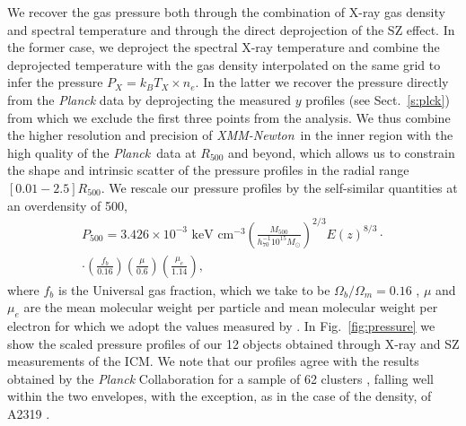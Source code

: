 \documentclass[traditabstract   ]{aa} %
\newcommand{\xmm}{{\it XMM-Newton}}
\newcommand{\planck}{{\it Planck}}
\begin{document}
We recover the gas pressure both through the combination of X-ray gas density and spectral temperature and through the direct deprojection of the SZ effect. In the former case, we deproject the spectral X-ray temperature \citep[e.g.,][see Sect. \ref{sec:spec}]{mazzotta+04} and combine the deprojected temperature with the gas density interpolated on the same grid to infer the pressure $P_X=k_BT_X\times n_e$. In the latter we recover the pressure directly from the \emph{Planck} data by deprojecting the measured $y$ profiles (see Sect.~\ref{s:plck}) from which we exclude the first three points from the analysis. We thus combine the higher resolution and precision of \xmm\ in the inner region with the high quality of the \planck\ data at $R_{500}$ and beyond, which allows us to constrain the shape and intrinsic scatter of the pressure profiles in the radial range $[0.01-2.5]R_{500}$.
We rescale our pressure profiles by the self-similar quantities at an overdensity of 500,
\begin{multline}
P_{500} = 3.426 \times 10^{-3} \text{\ keV} \text{\ cm}^{-3} \left(\frac{ M_{500} }{ h_{70}^{-1} 10^{15} M_\odot } \right)^{2/3} E(z)^{8/3} \cdot \\ \cdot \left(\frac{f_b}{0.16} \right) \left( \frac{\mu}{0.6} \right) \left( \frac{\mu_e}{1.14} \right)
\label{eq:P500},
\end{multline}
where $f_{b}$ is the Universal gas fraction, which we take to be $\Omega_b/\Omega_m = 0.16$ \citep[][rounding the number to 2 significant figures]{planck+16}, $\mu$ and $\mu_e$ are the mean molecular weight per particle and mean molecular weight per electron for which we adopt the values measured by \cite{ag89}. In Fig.~\ref{fig:pressure} we show the scaled pressure profiles of our 12 objects obtained through X-ray and SZ measurements of the ICM. We note that our profiles agree with the results obtained by the \textit{Planck} Collaboration for a sample of 62 clusters \citep{planck+13}, falling well within the two envelopes, with the exception, as in the case of the density, of A2319 \citep[see the discussion in][]{ghirardini18}. 
\end{document}

